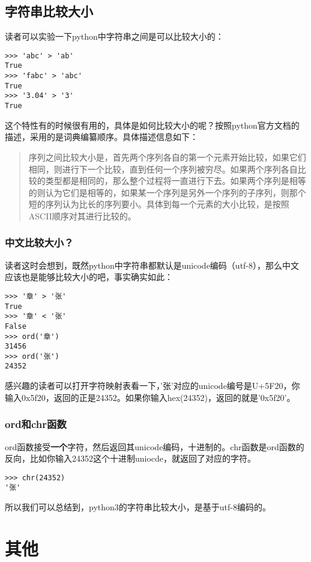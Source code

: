 \documentclass[12pt,oneside]{book}
\begin{document}
\begin{common-format}
\section{字符串比较大小}
读者可以实验一下python中字符串之间是可以比较大小的：

\begin{Verbatim}
>>> 'abc' > 'ab'
True
>>> 'fabc' > 'abc'
True
>>> '3.04' > '3'
True
\end{Verbatim}

这个特性有的时候很有用的，具体是如何比较大小的呢？按照python官方文档的描述，采用的是词典编纂顺序。具体描述信息如下：

\begin{quotation}
序列之间比较大小是，首先两个序列各自的第一个元素开始比较，如果它们相同，则进行下一个比较，直到任何一个序列被穷尽。如果两个序列各自比较的类型都是相同的，那么整个过程将一直进行下去。如果两个序列是相等的则认为它们是相等的，如果某一个序列是另外一个序列的子序列，则那个短的序列认为比长的序列要小。具体到每一个元素的大小比较，是按照ASCII顺序对其进行比较的。
\end{quotation}

\subsection{中文比较大小？}
读者这时会想到，既然python中字符串都默认是unicode编码（utf-8），那么中文应该也是能够比较大小的吧，事实确实如此：

\begin{Verbatim}
>>> '章' > '张'
True
>>> '章' < '张'
False
>>> ord('章')
31456
>>> ord('张')
24352
\end{Verbatim}

感兴趣的读者可以打开字符映射表看一下，'张'对应的unicode编号是U+5F20，你输入0x5f20，返回的正是24352。如果你输入hex(24352)，返回的就是'0x5f20'。


\subsection{ord和chr函数}
ord函数接受\textbf{一个}字符，然后返回其unicode编码，十进制的。chr函数是ord函数的反向，比如你输入24352这个十进制uniocde，就返回了对应的字符。
\begin{Verbatim}
>>> chr(24352)
'张'
\end{Verbatim}

所以我们可以总结到，python3的字符串比较大小，是基于utf-8编码的。



\chapter{其他}

\end{common-format}
\end{document}
